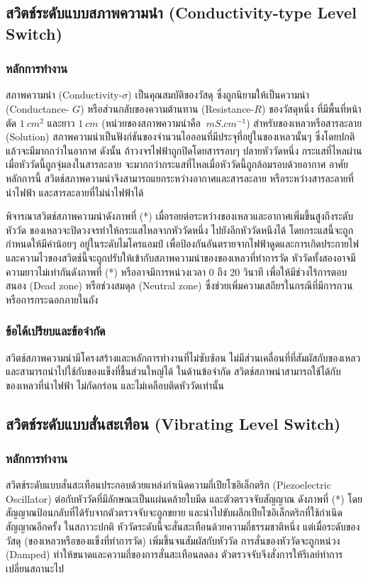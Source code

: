 \documentclass[final,11pt]{article}
\begin{document}
\subsection{สวิตช์ระดับแบบสภาพความนำ (Conductivity-type Level Switch)}
\subsubsection{หลักการทำงาน}
สภาพความนำ (Conductivity-$\sigma$) เป็นคุณสมบัติของวัสดุ ซึ่งถูกนิยามให้เป็นความนำ (Conductance- $G$) 
หรือส่วนกลับของความต้านทาน (Resistance-$R$) ของวัสดุหนึ่ง ที่มีพื้นที่หน้าตัด $\SI{1}{cm^2}$ และยาว $\SI{1}{cm}$ 
(หน่วยของสภาพความนำคือ $\SI{}{mS.cm^{-1}}$) สำหรับของเหลวหรือสารละลาย (Solution) 
สภาพความนำเป็นฟังก์ชันของจำนวนไอออนที่มีประจุที่อยู่ในของเหลวนั้นๆ ซึ่งโดยปกติแล้วจะมีมากกว่าในอากาศ ดังนั้น 
ถ้าวงจรไฟฟ้าถูกปิดโดยสารรอบๆ ปลายหัววัดหนึ่ง กระแสที่ไหลผ่านเมื่อหัววัดนี้ถูกจุ่มลงในสารละลาย จะมากกว่ากระแสที่ไหลเมื่อหัววัดนี้ถูกล้อมรอบด้วยอากาศ
อาศัยหลักการนี้ สวิตช์สภาพความนำจึงสามารถแยกระหว่างอากาศและสารละลาย หรือระหว่างสารละลายที่นำไฟฟ้า และสารละลายที่ไม่นำไฟฟ้าได้ 

พิจารณาสวิตช์สภาพความนำดังภาพที่ (*) เมื่อรอยต่อระหว่างของเหลวและอากาศเพิ่มขึ้นสูงถึงระดับหัววัด ของเหลวจะปิดวงจรทำให้กระแสไหลจากหัววัดหนึ่ง
ไปยังอีกหัววัดหนึงได้ โดยกระแสนี้จะถูกกำหนดให้มีค่าน้อยๆ อยู่ในระดับไมโครแอมป์ เพื่อป้องกันอันตรายจากไฟฟ้าดูดและการเกิดประกายไฟ 
และความไวของสวิตช์นี้จะถูกปรับให้เข้ากับสภาพความนำของของเหลวที่ทำการวัด หัววัดทั้งสองอาจมีความยาวไม่เท่ากันดังภาพที่ (*) หรืออาจมึการหน่วงเวลา 0 ถึง 20 วินาที 
เพื่อให้มีช่วงไร้การตอบสนอง (Dead zone) หรือช่วงสมดุล (Neutral zone) ซึ่งช่วยเพิ่มความเสถียรในกรณีที่มีการกวน หรือการกระฉอกภายในถัง 

\subsubsection{ข้อได้เปรียบและข้อจำกัด}
สวิตช์สภาพความนำมีโครงสร้างและหลักการทำงานที่ไม่ซับซ้อน ไม่มีส่วนเคลื่อนที่ที่สัมผัสกับของเหลว และสามารถนำไปใช้กับของแข็งที่ชื้นส่วนใหญ่ได้ 
ในด้านข้อจำกัด สวิตช์สภาพนำสามารถใช้ได้กับของเหลวที่นำไฟฟ้า ไม่กัดกร่อน และไม่เคลือบติดหัววัดเท่านั้น

\subsection{สวิตช์ระดับแบบสั่นสะเทือน (Vibrating Level Switch)}
\subsubsection{หลักการทำงาน}
สวิตช์ระดับแบบสั่นสะเทือนประกอบด้วยแหล่งกำเนิดความถี่เปียโซอิเล็กตริก (Piezoelectric Oscillator) ต่อกับหัววัดที่มีลักษณะเป็นแผ่นคล้ายใบมีด 
และตัวตรวจจับสัญญาณ ดังภาพที่ (*) โดยสัญญาณป้อนกลับที่ได้รับจากตัวตรวจจับจะถูกขยาย และนำไปขับผลึกเปียโซอิเล็กตริกที่ใช้กำเนิดสัญญาณอีกครั้ง
ในสภาวะปกติ หัววัดระดับนี้จะสั่นสะเทือนด้วยความถี่ธรรมชาติหนึ่ง แต่เมื่อระดับของวัสดุ (ของเหลวหรือของแข็งที่ทำการวัด) เพิ่มขึ้นจนสัมผัสกับหัววัด 
การสั่นของหัววัดจะถูกหน่วง (Damped) ทำให้ขนาดและความถี่ของการสั่นสะเทือนลดลง ตัวตรวจจับจึงสั่งการให้รีเลย์ทำการเปลี่ยนสถานะไป
\end{document}
